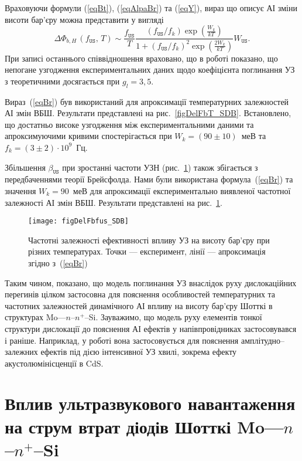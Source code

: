 Враховуючи формули (\ref{eqBt}), (\ref{eqAlpaBr}) та (\ref{eqY}),
вираз що описує АІ зміни висоти бар'єру можна представити у вигляді
\begin{equation}
\label{eqBr}
\Delta\Phi_{b,H}\,(f_\mathtt{US},\,T)\sim\frac{f_\mathtt{US}}{T}\frac{(f_\mathtt{US}/{f_k})\exp\left(\frac{W_k}{kT}\right)}
{1+(f_\mathtt{US}/{f_k})^2\exp\left(\frac{2W_k}{kT}\right)}W_\mathtt{US}.
\end{equation}
При записі останнього співвідношення враховано, що
в роботі \cite{Olikh:UPJ2014} показано, що непогане узгодження експериментальних даних щодо коефіцієнта поглинання УЗ з теоретичними
досягається при $g_l=3,5$.



Вираз~(\ref{eqBr}) був використаний для апроксимації температурних залежностей АІ змін ВБШ.
Результати представлені на рис.~\ref{figDelFbT_SDB}.
Встановлено, що достатньо високе узгодження між експериментальними даними та апроксимуючими кривими спостерігається
при  $W_k=(90\pm10)$~меВ та $f_k=(3\pm2)\cdot10^9$~Гц.

Збільшення $\beta_\mathtt{US}$ при зростанні частоти УЗН (рис.~\ref{figDelFbfus_SDB}) також збігається
з передбаченнями теорії Брейсфолда.
Нами були використана формула~(\ref{eqBr}) та значення $W_k=90$~меВ для апроксимації експериментально виявленої частотної залежності АІ змін ВБШ.
Результати представлені на рис.~\ref{figDelFbfus_SDB}.


\begin{figure}
\center
\texttt{[image: figDelFbfus\_SDB]}
\caption{\label{figDelFbfus_SDB}
Частотні залежності ефективності впливу УЗ на висоту бар'єру при різних температурах.
Точки --- експеримент,
лінії --- апроксимація згідно з~(\ref{eqBr})
}%
\end{figure}


Таким чином, показано, що модель поглинання УЗ внаслідок руху дислокаційних перегинів цілком застосовна
для пояснення особливостей температурних та частотних залежностей динамічного АІ впливу на висоту бар'єру Шотткі в структурах Mo---$n$--$n^+$--Si.
Зауважимо, що модель руху елементів тонкої структури дислокації до
пояснення АІ ефектів у напівпровідниках застосовувався і раніше.
Наприклад, у роботі \cite{Loktev} вона застосовується для пояснення амплітудно--залежних ефектів
під дією інтенсивної УЗ хвилі, зокрема ефекту акустолюмінісценції в CdS.


\section{Вплив ультразвукового навантаження на струм втрат діодів Шотткі Mo---$n$--$n^+$--Si\label{SSDB:Rev}}

